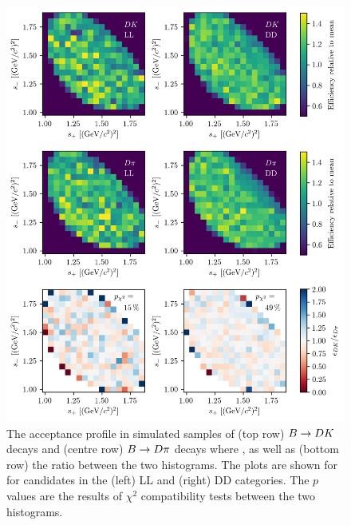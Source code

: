 \begin{figure}[tbp]
    \centering
    \includegraphics[width=\columnwidth]{figures/analysis/DP_thesis_m2_chi2_KK_LLandDD.png}
    \caption{The acceptance profile in simulated samples of (top row)  ${B}\rightarrow{\ensuremath{D}}{\ensuremath{K}}$ decays and (centre row)  ${B}\rightarrow{\ensuremath{D}}\pi$ decays where \DtoKskk, as well as (bottom row) the ratio between the two histograms. The plots are shown for for candidates in the (left) LL and (right) DD categories. The $p$ values are the results of $\chi^2$ compatibility tests between the two histograms.}
    \label{fig:dk_vs_dpi_chi2_kk}
\end{figure}

